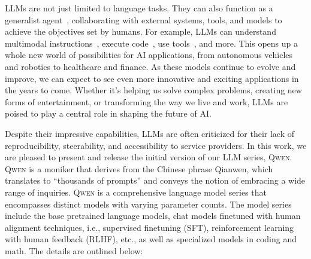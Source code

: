LLMs are not just limited to language tasks. They can also function as a generalist agent~\citep{generalist,ofasys, voyager, autogpt, metagpt}, collaborating with external systems, tools, and models to achieve the objectives set by humans. For example, LLMs can understand multimodal instructions~\citep{gpt4, qwenvl, llava, mplug-owl, instructblip, kosmos2}, execute code~\citep{codex, CodeGeeX, starcoder}, use tools~\citep{toolformer, langchain, autogpt}, and more. This opens up a whole new world of possibilities for AI applications, from autonomous vehicles and robotics to healthcare and finance. As these models continue to evolve and improve, we can expect to see even more innovative and exciting applications in the years to come. Whether it's helping us solve complex problems, creating new forms of entertainment, or transforming the way we live and work, LLMs are poised to play a central role in shaping the future of AI.

Despite their impressive capabilities, LLMs are often criticized for their lack of reproducibility, steerability, and accessibility to service providers. In this work, we are pleased to present and release the initial version of our LLM series, \textsc{Qwen}. 
\textsc{Qwen} is a moniker that derives from the Chinese phrase Qianwen, which translates to ``thousands of prompts'' and conveys the notion of embracing a wide range of inquiries. 
\textsc{Qwen} is a comprehensive language model series that encompasses distinct models with varying parameter counts. The model series include the base pretrained language models, chat models finetuned with human alignment techniques, i.e., supervised finetuning (SFT), reinforcement learning with human feedback (RLHF), etc., as well as specialized models in coding and math. The details are outlined below:

